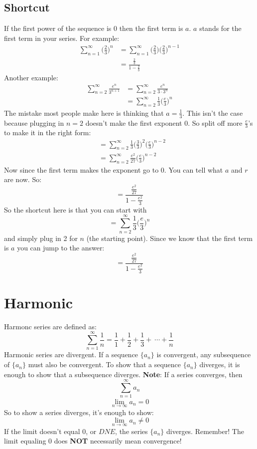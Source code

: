 \documentclass{report}
\begin{document}
    \subsection{Shortcut}
        If the first power of the sequence is 0 then the first term is \(a\). \(a\) stands for the first term in your series.
        For example:
        \begin{align*}
            \sum_{n=1}^{\infty} \Big ( \frac{2}{3} \Big )^n & = \sum_{n=1}^{\infty} \Big ( \frac{2}{3} \Big )\Big ( \frac{2}{3} \Big )^{n-1} \\
            & = \frac{\frac{2}{3}}{1-\frac{2}{3}}
        \end{align*}
        Another example:
        \begin{align*}
            \sum_{n=2}^{\infty} \frac{e^n}{3^{n+1}} & = \sum_{n=2}^{\infty} \frac{e^n}{3\cdot 3^n} \\
            & = \sum_{n=2}^{\infty} \frac{1}{3} \Big( \frac{e}{3}\Big)^n
        \end{align*}
        The mistake most people make here is thinking that \(a = \frac{1}{3}\). This isn't the case because plugging in \(n=2\) doesn't make the first exponent 0. So split off more \(\frac{e}{3}\)'s to make it in the right form:
        \begin{align*}
            & = \sum_{n=2}^{\infty} \frac{1}{3} \Big( \frac{3}{3} \Big)^2 \Big( \frac{e}{3} \Big) ^{n-2} \\
            & = \sum_{n=2}^{\infty} \frac{e^2}{27} \Big( \frac{e}{3} \Big) ^{n-2}
        \end{align*}
        Now since the first term makes the exponent go to 0. You can tell what \(a\) and \(r\) are now. So:
        \[= \frac{ \frac{e^2}{27} }{1- \frac{e^2}{3}}\]
        So the shortcut here is that you can start with
        \[= \sum_{n=2}^{\infty} \frac{1}{3} \Big( \frac{e}{3}\Big)^n\]
        and simply plug in 2 for \(n\) (the starting point). Since we know that the first term is \(a\) you can jump to the answer:
        \[= \frac{ \frac{e^2}{27} }{1- \frac{e^2}{3}}\]
        
\section{Harmonic}
    Harmonc series are defined as:
    \[\sum_{n=1}^{\infty} \frac{1}{n} = \frac{1}{1} + \frac{1}{2} + \frac{1}{3} +\ \cdots + \frac{1}{n}\]
    Harmonic series are divergent. If a sequence \(\{a_n\}\) is convergent, any subsequence of \(\{a_n\}\) must also be convergent. To show that a sequence \(\{a_n\}\) diverges, it is enough to show that a subsequence diverges.
    \textbf{Note}: If a series converges, then
    \[\sum_{n=1}^{\infty} a_n\]
    \[\lim_{n \rightarrow \infty}^{} a_n = 0\]
    So to show a series diverges, it's enough to show:
    \[\lim_{n \rightarrow \infty} a_n \neq 0\]
    If the limit doesn't equal 0, or \(DNE\), the series \(\{a_n\}\) diverges.
    Remember! The limit equaling 0 does \textbf{NOT} necessarily mean convergence!
\end{document}
